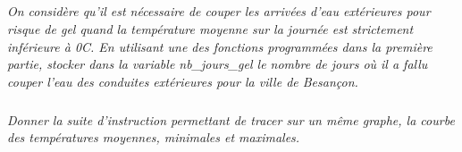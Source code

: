\documentclass[10pt]{article}
\newif\ifprof
\begin{document}
\subparagraph{} 
\textit{On considère qu’il est nécessaire de couper les arrivées d’eau extérieures pour risque de gel quand la
température moyenne sur la journée est strictement inférieure à 0\textdegree C. En utilisant une des fonctions
programmées dans la première partie, stocker dans la variable \textsf{nb\_jours\_gel} le nombre de jours où
il a fallu couper l’eau des conduites extérieures pour la ville de Besançon.
}
\ifprof
\begin{corrige}
\begin{py}
\begin{python}
>>> nb_jours_gel=majores_par(Tmoy,0)
\end{python}
\end{py}
\end{corrige}
\else
\fi


\subparagraph{}
\textit{Donner la suite d'instruction permettant de tracer sur un même graphe, la courbe des températures moyennes, minimales et maximales.}
\ifprof
\begin{corrige}
\begin{py}
\begin{python}
import numpy as np
import matplotlib.pyplot as plt 
plt.plot(t,Tmin)
plt.plot(t,Tmax)
plt.plot(t,Tmoy)
plt.show()
\end{python}
\end{py}
\end{corrige}
\else
\fi
\end{document}
